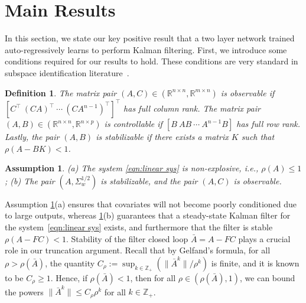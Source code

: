 \documentclass[11pt]{article}
\newtheorem{definition}{Definition}
\renewcommand{\cite}{\citep}
\newtheorem{assumption}{Assumption}
\newcommand{\Abar}{\bar{A}}
\newcommand{\R}{\mathbb{R}}				%
\newcommand{\T}{\top}
\newcommand{\<}{\langle}
\renewcommand{\>}{\rangle}
\numberwithin{equation}{section}
\newcommand{\sd}[1]{\textcolor{teal}{[sd: #1]}}
\newcommand{\yj}[1]{\textcolor{purple}{[yj: #1]}}
\begin{document}
\section{Main Results} \label{sec:main-results}
In this section, we state our key positive result that a two layer network trained auto-regressively learns to perform Kalman filtering. First, we introduce some conditions required for our results to hold. These conditions are very standard in subspace identification literature~\cite{knudsen2001consistency}.
\begin{definition}
    The matrix pair $(A,C) \in (\R^{n \times n},\R^{m \times n})$ is observable if $[C^\T~(CA)^\T~\cdots~(CA^{n-1})^\T]^\T$ has full column rank. The matrix pair $(A,B)\in (\R^{n \times n},\R^{n \times p})$ is controllable if $[B~A B~\cdots~A^{n-1}B]$ has full row rank. 
    Lastly, the pair $(A,B)$ is stabilizable if there exists a matrix $K$ such that $\rho(A-BK)<1$.  
\end{definition}

\begin{assumption} \label{assump:System main}
    (a) The system \eqref{eqn:linear sys} is non-explosive, i.e., $\rho(A) \leq 1$; (b) The pair $(A, \Sigma_w^{1/2})$ is stabilizable, and the pair $(A,C)$ is observable. 
\end{assumption}
Assumption \ref{assump:System main}(a) ensures that covariates will not become poorly conditioned due to large outputs, whereas \ref{assump:System main}(b) guarantees that a steady-state Kalman filter for the system~\eqref{eqn:linear sys} exists, and furthermore that the filter is stable $\rho(A-FC) <1$. 
Stability of the filter closed loop $\Abar=A-FC$ plays a crucial role in our truncation argument.
Recall that by Gelfand's formula, for all $\rho > \rho(\Abar)$, the quantity $C_{\rho} := \sup_{k \in \mathbb{Z}_+}(\|\Abar^k\|/ \rho^k)$ is finite, and it is known to be $C_{\rho} \ge 1$. Hence, if $\rho(\Abar) < 1$, then for all $\rho \in (\rho(\Abar), 1)$, we can bound the powers $\|\Abar^k\| \leq C_{\rho} \rho^k$ for all $k \in \mathbb{Z}_+$.
\end{document}
